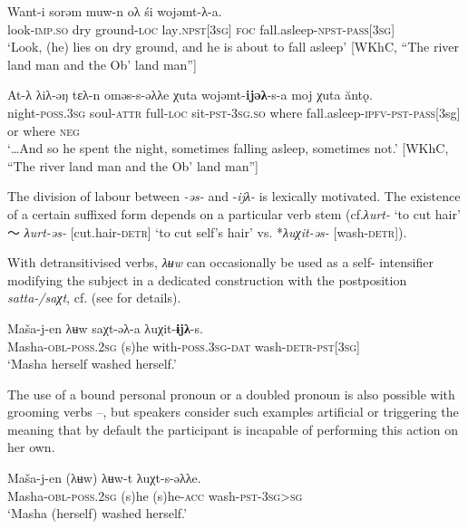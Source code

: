 \documentclass[output=paper]{langscibook}
\begin{document}
\ea 
\label{ex:Volkova:51}
	\ea
	\label{ex:Volkova:51a}
  	 \gll Want-i sorəm muw-n oλ śi wojəmt-λ-a.\\
  	 look\textsc{{}-imp.so} dry ground\textsc{{}-loc} lay\textsc{.npst[3sg]} \textsc{foc} fall.asleep\textsc{{}-npst-pass[3sg]}\\
  	 \glt ‘Look, (he) lies on dry ground, and he is about to fall asleep’ [WKhC, “The river land man and the Ob’ land man”]

	\ex
	\label{ex:Volkova:51b}
  	 \gll At-λ λiλ-əŋ tɛλ-n oməs-s-əλλe χuta wojəmt-\textbf{ijəλ}{}-s-a moj χuta ăntǫ.\\
  	 night\textsc{{}-poss.3sg} soul\textsc{{}-attr} full\textsc{{}-loc} sit\textsc{{}-pst-3sg.so} where fall.asleep\textsc{{}-ipfv-pst-pass[}3sg] or where \textsc{neg}
\\
  	 \glt ‘…And so he spent the night, sometimes falling asleep, sometimes not.’ [WKhC, “The river land man and the Ob’ land man”]
	\z
\z

The division of labour between \textit{{}-əs-} and -\textit{ijλ-} is lexically motivated. The existence of a certain suffixed form depends on a particular verb stem (cf.\textit{λurt-} ‘to cut hair’ 〜 \textit{λurt-əs-} [cut.hair-\textsc{detr}] ‘to cut self’s hair’ vs. *\textit{λuχit-əs-} [wash-\textsc{detr}]).

With detransitivised verbs, \textit{λʉw} can occasionally be used as a self-%
intensifier modifying the subject in a dedicated construction with the postposition \textit{satta-/saχt}, cf.  (see  for details). 

\ea 
\label{ex:Volkova:52}
 \gll Maša-j-en  λʉw saχt-əλ-a  λuχit-\textbf{ɨjλ}{}-s.\\
 Masha\textsc{{}-obl-poss.2sg} (s)he with\textsc{{}-poss.3sg-dat} wash\textsc{{}-detr-pst[3sg]}\\
 \glt ‘Masha herself washed herself.’
\z


The use of a bound personal pronoun or a doubled pronoun is also possible with grooming verbs --, but speakers consider such examples artificial or triggering the meaning that by default the participant is incapable of performing this action on her own.

\ea 
\label{ex:Volkova:53}
 \gll Maša-j-en  (λʉw) λʉw-t λuχt-s-əλλe.\\
 Masha\textsc{{}-obl-poss.2sg} (s)he (s)he\textsc{{}-acc} wash\textsc{{}-pst-3sg>sg}\\
 \glt ‘Masha (herself) washed herself.’
\z
 
\end{document}

